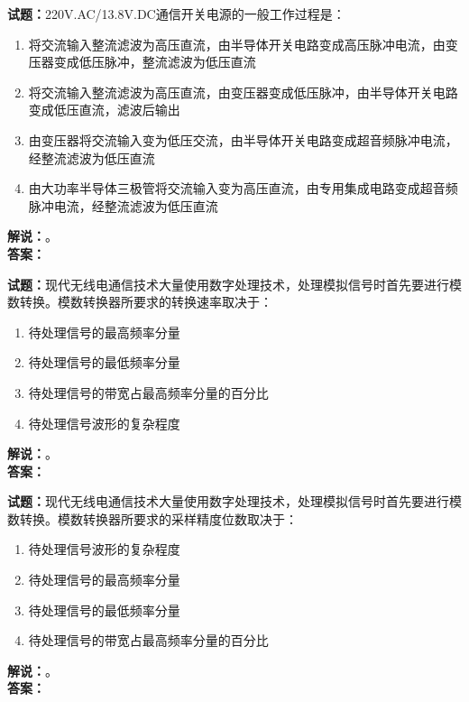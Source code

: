 \documentclass{ctexbook}
\begin{document}
\bigskip




\noindent\textbf{试题：}220V.AC/13.8V.DC通信开关电源的一般工作过程是：
\begin{enumerate}[leftmargin=3em]
\item 将交流输入整流滤波为高压直流，由半导体开关电路变成高压脉冲电流，由变压器变成低压脉冲，整流滤波为低压直流
\item 将交流输入整流滤波为高压直流，由变压器变成低压脉冲，由半导体开关电路变成低压直流，滤波后输出
\item 由变压器将交流输入变为低压交流，由半导体开关电路变成超音频脉冲电流，经整流滤波为低压直流
\item 由大功率半导体三极管将交流输入变为高压直流，由专用集成电路变成超音频脉冲电流，经整流滤波为低压直流
\end{enumerate}
\noindent\textbf{解说：}\textbf{}。\\\noindent\textbf{答案：}

\bigskip




\noindent\textbf{试题：}现代无线电通信技术大量使用数字处理技术，处理模拟信号时首先要进行模数转换。模数转换器所要求的转换速率取决于：
\begin{enumerate}[leftmargin=3em]
\item 待处理信号的最高频率分量
\item 待处理信号的最低频率分量
\item 待处理信号的带宽占最高频率分量的百分比
\item 待处理信号波形的复杂程度
\end{enumerate}
\noindent\textbf{解说：}\textbf{}。\\\noindent\textbf{答案：}

\bigskip




\noindent\textbf{试题：}现代无线电通信技术大量使用数字处理技术，处理模拟信号时首先要进行模数转换。模数转换器所要求的采样精度位数取决于：
\begin{enumerate}[leftmargin=3em]
\item 待处理信号波形的复杂程度
\item 待处理信号的最高频率分量
\item 待处理信号的最低频率分量
\item 待处理信号的带宽占最高频率分量的百分比
\end{enumerate}
\noindent\textbf{解说：}\textbf{}。\\\noindent\textbf{答案：}
\end{document}
